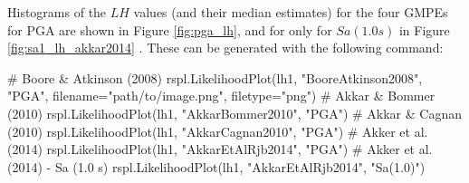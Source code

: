 Histograms of the $LH$ values (and their median estimates) for the four GMPEs for PGA are shown in Figure \ref{fig:pga_lh}, and for only \textcite{Akkar_etal2014} for $Sa \left( {1.0 s} \right)$ in Figure \ref{fig:sa1_lh_akkar2014} . These can be generated with the following command:

\begin{python}
# Boore & Atkinson (2008)
rspl.LikelihoodPlot(lh1, "BooreAtkinson2008", "PGA",
                    filename="path/to/image.png",
                    filetype="png")
# Akkar & Bommer (2010)
rspl.LikelihoodPlot(lh1, "AkkarBommer2010", "PGA")
# Akkar & Cagnan (2010)
rspl.LikelihoodPlot(lh1, "AkkarCagnan2010", "PGA")
# Akker et al. (2014)
rspl.LikelihoodPlot(lh1, "AkkarEtAlRjb2014", "PGA")
# Akker et al. (2014) - Sa (1.0 s)
rspl.LikelihoodPlot(lh1, "AkkarEtAlRjb2014", "Sa(1.0)")
\end{python}

